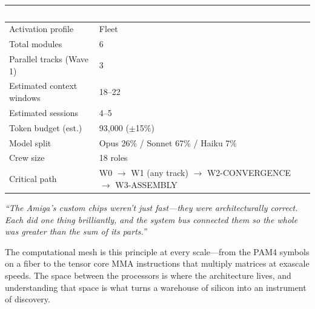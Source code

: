 \documentclass[11pt,letterpaper]{article}
\newcommand{\tableheader}[1]{\textbf{\sffamily\textcolor{white}{#1}}}
\begin{document}
\begin{center}
\begin{tabularx}{\textwidth}{L{5cm}X}
\toprule
{}
\tableheader{Metric} & \tableheader{Value} \\
\midrule
Activation profile & Fleet \\
Total modules & 6 \\
Parallel tracks (Wave 1) & 3 \\
Estimated context windows & 18--22 \\
Estimated sessions & 4--5 \\
Token budget (est.) & 93,000 ($\pm$15\%) \\
Model split & Opus 26\% / Sonnet 67\% / Haiku 7\% \\
Crew size & 18 roles \\
Critical path & W0 $\rightarrow$ W1 (any track) $\rightarrow$ W2-CONVERGENCE $\rightarrow$ W3-ASSEMBLY \\
\bottomrule
\end{tabularx}
\end{center}

\vspace{1cm}

\begin{quotebox}
\emph{``The Amiga's custom chips weren't just fast---they were architecturally correct. Each did one thing brilliantly, and the system bus connected them so the whole was greater than the sum of its parts.''}

\vspace{0.5em}

The computational mesh is this principle at every scale---from the PAM4 symbols on a fiber to the tensor core MMA instructions that multiply matrices at exascale speeds. The space between the processors is where the architecture lives, and understanding that space is what turns a warehouse of silicon into an instrument of discovery.
\end{quotebox}
\end{document}
